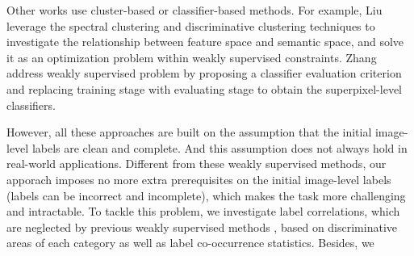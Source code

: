 Other works use cluster-based or classifier-based methods. For example, Liu \etal \cite{liu2013weakly} leverage the spectral clustering and discriminative clustering techniques to investigate the relationship between feature space and semantic space, and solve it as an optimization problem within weakly supervised constraints. Zhang \etal \cite{zhang2013sparse} address weakly supervised problem by proposing a classifier evaluation criterion and replacing training stage with evaluating stage to obtain the superpixel-level classifiers.

However, all these approaches are built on the assumption that the initial image-level labels are clean and complete. And this assumption does not always hold in real-world applications. Different from these weakly supervised methods, our apporach imposes no more extra prerequisites on the initial image-level labels (\eg labels can be incorrect and incomplete), which makes the task more challenging and intractable. To tackle this problem, we investigate label correlations, which are neglected by previous weakly supervised methods \cite{verbeek2007region,vezhnevets2010towards,vezhnevets2011weakly,vezhnevets2012weakly,xu2014tell}, based on discriminative areas of each category as well as label co-occurrence statistics. Besides, we 
